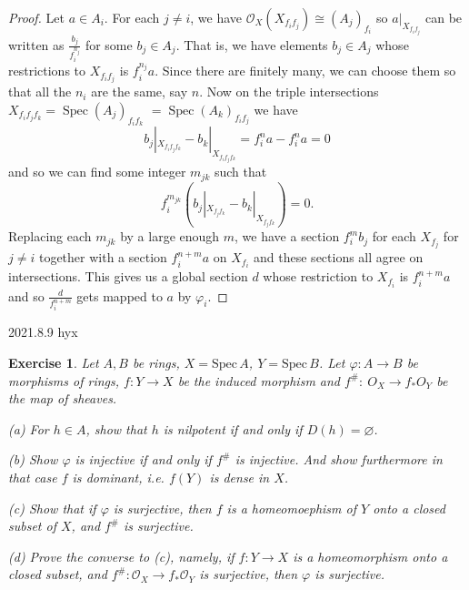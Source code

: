 \documentclass[12pt]{amsart}
\newtheorem{exe}{Exercise}[subsection]
\begin{document}
\begin{proof}
Let $a \in A_{i} .$ For each $j \neq i$, we have $\mathcal{O}_{X}\left(X_{f_{i} f_{j}}\right) \cong \left(A_{j}\right)_{f_{i}}$ so $a|_{X_{f_{i} f_{j}}}$ can be written as $\frac{b_{j}}{f_{i}^{n_{j}}}$ for some $b_{j} \in A_{j} .$ That is, we have elements $b_{j} \in A_{j}$ whose restrictions to $X_{f_{i} f_{j}}$ is $f_{i}^{n_{j}} a$. Since there are finitely many, we can choose them so that all the $n_{i}$ are the same, say $n .$ Now on the triple intersections $X_{f_{i} f_{j} f_{k}}=\operatorname{Spec}\left(A_{j}\right)_{f_{i} f_{k}}$ $=\operatorname{Spec}\left(A_{k}\right)_{f_{i} f_{j}}$ we have $$b_{j}|_{X_{f_if_jf_k}}-b_{k}|_{X_{f_if_jf_k}}=f_{i}^{n} a-f_{i}^{n} a=0$$ and so we can find some integer $m_{j k}$ such that $$f_{i}^{m_{j k}}\left(b_{j}|_{X_{f_jf_k}}-b_{k}|_{X_{f_jf_k}}\right)=0.$$ Replacing each $m_{j k}$ by a large enough $m$, we have a section $f_{i}^{m} b_{j}$ for each $X_{f_{j}}$ for $j \neq i$ together with a section $f_{i}^{n+m} a$ on $X_{f_{i}}$ and these sections all agree on intersections. This gives us a global section $d$ whose restriction to $X_{f_{i}}$ is $f_{i}^{n+m} a$ and so $\frac{d}{f_{i}^{n+m}}$ gets mapped to $a$ by $\varphi_{i}$.
\end{proof}

2021.8.9 hyx 
\begin{exe}
	\label{2.2.18}
Let $A, B$ be rings, $X=\mathrm{Spec}\,A$, $Y=\mathrm{Spec}\,B$. Let $\varphi : A\rightarrow B$ be morphisms of rings, $f: Y\rightarrow X $
be the induced morphism and $f^\#:\ O_X \rightarrow f_*O_Y$ be the map of sheaves.

(a) For $h\in A$, show that $h$ is nilpotent if and only if $D(h)=\varnothing$.

(b) Show $\varphi$ is injective if and only if $f^\#$ is injective. And show furthermore in that case $f$ is \emph{dominant}, i.e. $f(Y)$ is dense in $X$.

(c) Show that if $\varphi$ is surjective, then $f$ is a homeomoephism of $Y$ onto a closed subset of $X$, and $f^\#$ is surjective.

(d) Prove the converse to (c), namely, if $f:Y\to X$ is a homeomorphism onto a closed subset, and $f^\#:\mathcal{O}_X\to f_*\mathcal{O}_Y$ is surjective, then $\varphi$ is surjective.
\end{exe}
\end{document}
